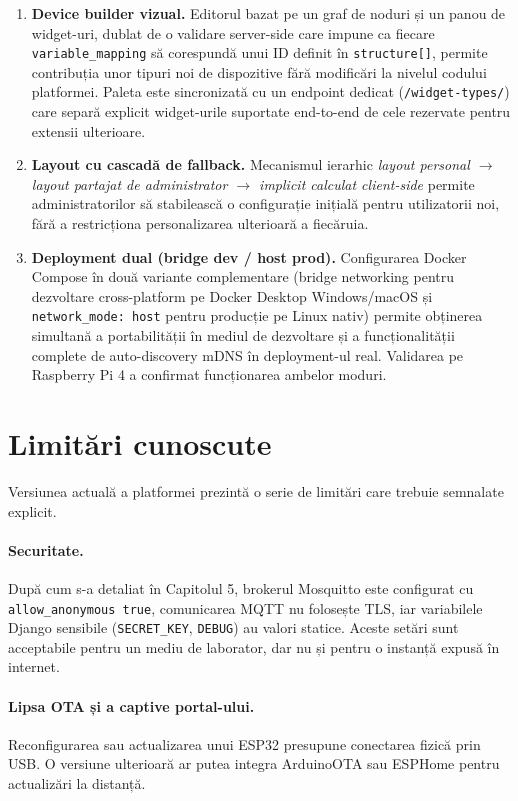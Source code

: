 \begin{enumerate}
    \item \textbf{Device builder vizual.} Editorul bazat pe un graf de noduri și un panou de widget-uri, dublat de o validare server-side care impune ca fiecare \texttt{variable\_mapping} să corespundă unui ID definit în \texttt{structure[]}, permite contribuția unor tipuri noi de dispozitive fără modificări la nivelul codului platformei. Paleta este sincronizată cu un endpoint dedicat (\texttt{/widget-types/}) care separă explicit widget-urile suportate end-to-end de cele rezervate pentru extensii ulterioare.
    \item \textbf{Layout cu cascadă de fallback.} Mecanismul ierarhic \emph{layout personal $\rightarrow$ layout partajat de administrator $\rightarrow$ implicit calculat client-side} permite administratorilor să stabilească o configurație inițială pentru utilizatorii noi, fără a restricționa personalizarea ulterioară a fiecăruia.
    \item \textbf{Deployment dual (bridge dev / host prod).} Configurarea Docker Compose în două variante complementare (bridge networking pentru dezvoltare cross-platform pe Docker Desktop Windows/macOS și \texttt{network\_mode: host} pentru producție pe Linux nativ) permite obținerea simultană a portabilității în mediul de dezvoltare și a funcționalității complete de auto-discovery mDNS în deployment-ul real. Validarea pe Raspberry Pi 4 a confirmat funcționarea ambelor moduri.
\end{enumerate}

\section*{Limitări cunoscute}
Versiunea actuală a platformei prezintă o serie de limitări care trebuie semnalate explicit.

\paragraph*{Securitate.} După cum s-a detaliat în Capitolul 5, brokerul Mosquitto este configurat cu \texttt{allow\_anonymous true}, comunicarea MQTT nu folosește TLS, iar variabilele Django sensibile (\texttt{SECRET\_KEY}, \texttt{DEBUG}) au valori statice. Aceste setări sunt acceptabile pentru un mediu de laborator, dar nu și pentru o instanță expusă în internet.

\paragraph*{Lipsa OTA și a captive portal-ului.} Reconfigurarea sau actualizarea unui ESP32 presupune conectarea fizică prin USB. O versiune ulterioară ar putea integra ArduinoOTA sau ESPHome pentru actualizări la distanță.

